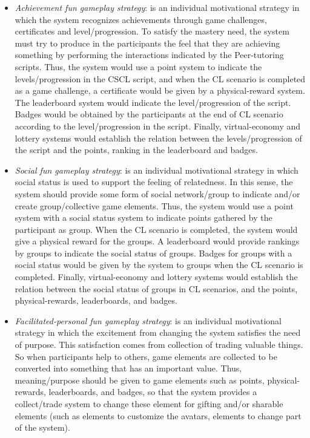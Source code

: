 \begin{itemize}
\item \emph{Achievement fun gameplay strategy}:
is an individual motivational strategy in which the system recognizes achievements through game challenges, certificates and level/progression.
To satisfy the mastery need, the system must try to produce in the participants the feel that they are achieving something by performing the interactions indicated by the Peer-tutoring scripts.
Thus, the system would use a point system to indicate the levels/progression in the CSCL script, and when the CL scenario is completed as a game challenge, a certificate would be given by a physical-reward system.
The leaderboard system would indicate the level/progression of the script.
Badges would be obtained by the participants at the end of CL scenario according to the level/progression in the script.
Finally, virtual-economy and lottery systems would establish the relation between the levels/progression of the script and the points, ranking in the leaderboard and badges.

\item \emph{Social fun gameplay strategy}:
is an individual motivational strategy in which social status is used to support the feeling of relatedness.
In this sense, the system should provide some form of social network/group to indicate and/or create group/collective game elements.
Thus, the system would use a point system with a social status system to indicate points gathered by the participant as group.
When the CL scenario is completed, the system would give a physical reward for the groups.
A leaderboard would provide rankings by groups to indicate the social status of groups.
Badges for groups with a social status would be given by the system to groups when the CL scenario is completed. 
Finally, virtual-economy and lottery systems would establish the relation between the social status of groups in CL scenarios, and the points, physical-rewards, leaderboards, and badges.

\item \emph{Facilitated-personal fun gameplay strategy}:
is an individual motivational strategy in which the excitement from changing the system satisfies the need of purpose. This satisfaction comes from collection of trading valuable things.
So when participants help to others, game elements are collected to be converted into something that has an important value.
Thus, meaning/purpose should be given to game elements such as points, physical-rewards, leaderboards, and badges, so that the system provides a collect/trade system to change these element for gifting and/or sharable elements (such as elements to customize the avatars, elements to change part of the system).
\end{itemize}

